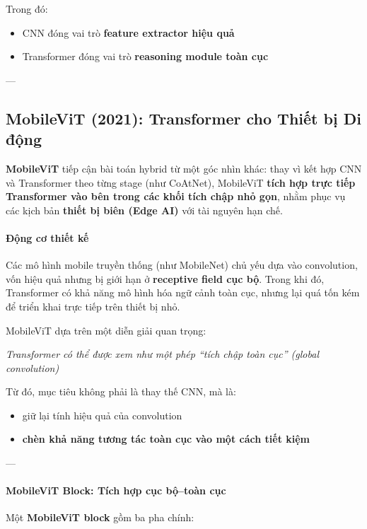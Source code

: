 Trong đó:
\begin{itemize}
	\item CNN đóng vai trò \textbf{feature extractor hiệu quả}
	\item Transformer đóng vai trò \textbf{reasoning module toàn cục}
\end{itemize}
---

\subsection{MobileViT (2021): Transformer cho Thiết bị Di động}
\label{subsec:mobilevit}

\textbf{MobileViT} \cite{Mehta2021} tiếp cận bài toán hybrid từ một góc nhìn khác:  
thay vì kết hợp CNN và Transformer theo từng stage (như CoAtNet), MobileViT \textbf{tích hợp trực tiếp Transformer vào bên trong các khối tích chập nhỏ gọn}, nhằm phục vụ các kịch bản \textbf{thiết bị biên (Edge AI)} với tài nguyên hạn chế.

\paragraph{Động cơ thiết kế}

Các mô hình mobile truyền thống (như MobileNet) chủ yếu dựa vào convolution, vốn hiệu quả nhưng bị giới hạn ở \textbf{receptive field cục bộ}.  
Trong khi đó, Transformer có khả năng mô hình hóa ngữ cảnh toàn cục, nhưng lại quá tốn kém để triển khai trực tiếp trên thiết bị nhỏ.

MobileViT dựa trên một diễn giải quan trọng:
\begin{center}
	\textit{Transformer có thể được xem như một phép “tích chập toàn cục” (global convolution)}
\end{center}

Từ đó, mục tiêu không phải là thay thế CNN, mà là:
\begin{itemize}
	\item giữ lại tính hiệu quả của convolution
	\item \textbf{chèn khả năng tương tác toàn cục vào một cách tiết kiệm}
\end{itemize}

---

\paragraph{MobileViT Block: Tích hợp cục bộ–toàn cục}

Một \textbf{MobileViT block} gồm ba pha chính:

